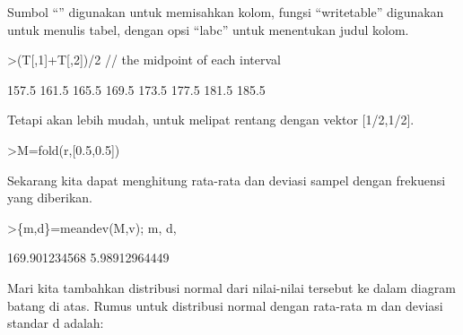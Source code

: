 \documentclass[a4paper,10pt]{article}
\begin{document}
\begin{eulernotebook}
\begin{eulercomment}
\begin{eulercomment}
\begin{eulercomment}
\begin{eulercomment}
\begin{eulercomment}
\begin{eulercomment}
\begin{eulercomment}
\begin{eulercomment}
\begin{eulercomment}
\begin{eulercomment}
\begin{eulercomment}
\begin{eulercomment}
\begin{eulercomment}
\begin{eulercomment}
\begin{eulercomment}
\begin{eulercomment}
\begin{eulercomment}
\begin{eulercomment}
\begin{eulercomment}
Sumbol “\textbar{}” digunakan untuk memisahkan kolom, fungsi “writetable”
digunakan untuk menulis tabel, dengan opsi “labc” untuk menentukan
judul kolom.
\end{eulercomment}
\begin{eulerprompt}
>(T[,1]+T[,2])/2 // the midpoint of each interval
\end{eulerprompt}
\begin{euleroutput}
          157.5 
          161.5 
          165.5 
          169.5 
          173.5 
          177.5 
          181.5 
          185.5 
\end{euleroutput}
\begin{eulercomment}
Tetapi akan lebih mudah, untuk melipat rentang dengan vektor
[1/2,1/2].
\end{eulercomment}
\begin{eulerprompt}
>M=fold(r,[0.5,0.5])
\end{eulerprompt}
\begin{euleroutput}
  [157.5,  161.5,  165.5,  169.5,  173.5,  177.5,  181.5,  185.5]
\end{euleroutput}
\begin{eulercomment}
Sekarang kita dapat menghitung rata-rata dan deviasi sampel dengan
frekuensi yang diberikan.
\end{eulercomment}
\begin{eulerprompt}
>\{m,d\}=meandev(M,v); m, d,
\end{eulerprompt}
\begin{euleroutput}
  169.901234568
  5.98912964449
\end{euleroutput}
\begin{eulercomment}
Mari kita tambahkan distribusi normal dari nilai-nilai tersebut ke
dalam diagram batang di atas. Rumus untuk distribusi normal dengan
rata-rata m dan deviasi standar d adalah:


\end{eulercomment}
\end{eulercomment}
\end{eulercomment}
\end{eulercomment}
\end{eulercomment}
\end{eulercomment}
\end{eulercomment}
\end{eulercomment}
\end{eulercomment}
\end{eulercomment}
\end{eulercomment}
\end{eulercomment}
\end{eulercomment}
\end{eulercomment}
\end{eulercomment}
\end{eulercomment}
\end{eulercomment}
\end{eulercomment}
\end{eulercomment}
\end{eulernotebook}
\end{document}

